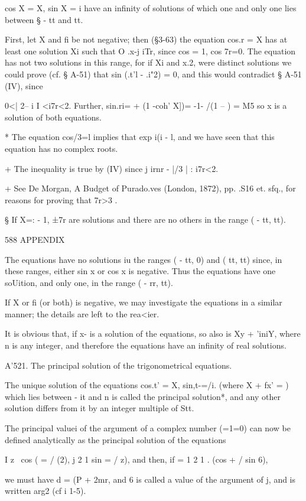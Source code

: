 cos X = X, sin X = i have an infinity of solutions of which one and
only one lies between § - tt and tt.

First, let X and fi be not negative; then (§3-63) the equation cos.r
= X has at least one solution Xi such that O .x-j iTr, since cos = 1,
cos 7r=0. The equation has not two solutions in this range, for if Xi
and x.2, were distinct solutions we could prove (cf. § A-51) that sin
(.t'l - .i"2) = 0, and this would contradict § A-51 (IV), since

0<| 2-- i I <i7r<2. Further, sin.ri= + (1 -coh' X])= -1- /(1 -- ) = M5
so x is a solution of both equations.

* The equation cos/3=l implies that exp i(i - l, and we have seen that
this equation has no complex roots.

+ The inequality is true by (IV) since j irnr - |/3 | : i7r<2.

+ See De Morgan, A Budget of Purado.ves (London, 1872), pp. .S16 et.
sfq., for reasons for proving that 7r>3 .

§ If X=: - 1, ±7r are solutions and there are no others in the range (
- tt, tt).



588 APPENDIX

The equations have no solutions iu the ranges ( - tt, 0) and ( tt, tt)
since, in these ranges, either sin x or cos x is negative. Thus the
equations have one soUition, and only one, in the range ( - rr, tt).

If X or fi (or both) is negative, we may investigate the equations in
a similar manner; the details are left to the rea<ier.

It is obvious that, if x- is a solution of the equations, so also is
Xy + 'iniY, where n is any integer, and therefore the equations have
an infinity of real solutions.

A'521. The principal solution of the trigonometrical equations.

The unique solution of the equations cos.t' = X, sin,t-=/i. (where X +
fx' = ) which lies between - it and n is called the principal
solution*, and any other solution differs from it by an integer
multiple of Stt.

The principal valuei of the argument of a complex number (=1=0) can
now be defined analytically as the principal solution of the equations

I z \ cos ( = / (2), j 2 1 sin = / z), and then, if = 1 2 1 . (cos + /
sin 6),

we must have d = (P + 2mr, and 6 is called a value of the argument of
j, and is written arg2 (cf i 1-5).

